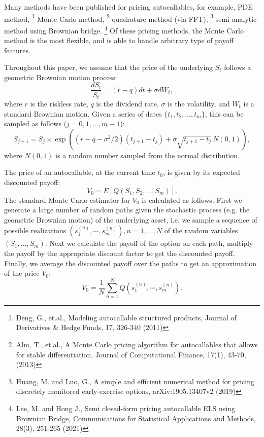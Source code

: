 Many methods have been published for pricing autocallables, for example, 
PDE method,
\footnote{Deng, G., et.al., Modeling autocallable structured products,
          Journal of Derivatives \& Hedge Funds, 17, 326-340 (2011)}
Monte Carlo method,
\footnote{Alm, T., et.al., A Monte Carlo pricing algorithm for autocallables
          that allows for stable differentiation, Journal of Computational
          Finance, 17(1), 43-70, (2013)}
quadrature method (via FFT),
\footnote{Huang, M. and Luo, G., A simple and efficient numerical method for
          pricing discretely monitored early-exercise options,
          arXiv:1905.13407v2 (2019)}
semi-analytic method using Brownian bridge.
\footnote{Lee, M. and Hong J., Semi closed-form pricing autocallable ELS using
          Brownian Bridge, Communications for Statistical Applications and
          Methods, 28(3), 251-265 (2021)}
Of these pricing methods, the Monte Carlo method is the most flexible, and is
able to handle arbitrary type of payoff features.

Throughout this paper, we assume that the price of the underlying $S_t$ follows 
a geometric Brownian motion process:
\begin{equation}
  \frac{dS_t}{S_t} = (r-q)dt + \sigma dW_t,
\end{equation}
where $r$ is the riskless rate, $q$ is the dividend rate, $\sigma$ is the
volatility, and $W_t$ is a standard Brownian motion.
Given a series of dates $\{t_1,t_2,\dots,t_m\}$, this can be sampled as 
follows ($j=0,1,\dots,m-1$):
\begin{equation}
  S_{j+1} = S_j \times 
      \exp\left( 
        (r-q-\sigma^2/2)(t_{j+1}-t_j) + \sigma\sqrt{t_{j+1}-t_j}\, N(0,1)
          \right),
\end{equation}
where $N(0,1)$ is a random number sampled from the normal distribution.

The price of an autocallable, at the current time $t_0$, is given by its
expected discounted payoff:
\begin{equation}
  V_0 = E[Q(S_1,S_2,\dots,S_m)].
\end{equation}
The standard Monte Carlo estimator for $V_0$ is calculated as follows.
First we generate a large number of random paths given the stochastic
process (e.g. the geometric Brownian motion) of the underlying asset, 
i.e. we sample a sequence of possible realizations 
$(s^{(n)}_1, \cdots, s^{(n)}_m), n=1,\dots,N$
of the random variables $(S_1,\dots,S_m)$.
Next we calculate the payoff of the option on each path, multiply the 
payoff by the appropriate discount factor to get the discounted payoff.
Finally, we average the discounted payoff over the paths to
get an approximation of the price $V_0$:
\begin{equation}
  V_0 = \frac{1}{N} \sum_{n=1}^N Q(s^{(n)}_1, \cdots, s^{(n)}_m).
\end{equation}

